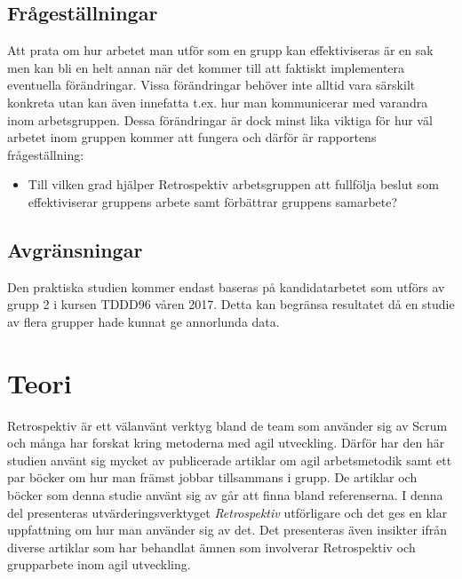 \subsection{Frågeställningar}
\label{sec:johan_n-research-questions}

Att prata om hur arbetet man utför som en grupp kan effektiviseras är en sak men kan bli en
helt annan när det kommer till att faktiskt implementera eventuella förändringar.
Vissa förändringar behöver inte alltid vara särskilt konkreta utan kan även innefatta t.ex. hur man 
kommunicerar med varandra inom arbetsgruppen. Dessa förändringar är dock minst lika viktiga för hur
väl arbetet inom gruppen kommer att fungera och därför är rapportens frågeställning:

\begin{itemize}
\item Till vilken grad hjälper Retrospektiv arbetsgruppen att fullfölja beslut som effektiviserar gruppens arbete samt förbättrar gruppens samarbete?
\end{itemize}


\subsection{Avgränsningar}
\label{sec:johan_n-delimitations}

Den praktiska studien kommer endast baseras på kandidatarbetet som utförs av
grupp 2 i kursen TDDD96 våren 2017. Detta kan begränsa resultatet då en studie av flera grupper hade kunnat ge annorlunda data.



\section{Teori}
\label{cha:johan_n-theory}

Retrospektiv är ett välanvänt verktyg bland de team som använder sig av Scrum och många har forskat
kring metoderna med agil utveckling. Därför har den här studien använt sig mycket av publicerade artiklar om agil arbetsmetodik
samt ett par böcker om hur man främst jobbar tillsammans i grupp. De artiklar och böcker som denna studie använt sig av går att finna bland referenserna. I denna del presenteras utvärderingsverktyget \textit{Retrospektiv} utförligare och det ges en klar uppfattning om hur man använder sig av det. Det presenteras även insikter ifrån diverse artiklar som har behandlat ämnen som involverar Retrospektiv och grupparbete inom agil utveckling.

